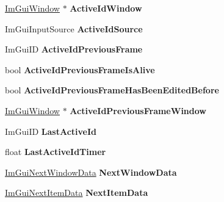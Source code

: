 \begin{DoxyCompactItemize}
\item 
\mbox{\label{structImGuiContext_a95a35b5d82d3fdea28b71580dc6a9618}} 
\hyperlink{structImGuiWindow}{Im\+Gui\+Window} $\ast$ {\bfseries Active\+Id\+Window}
\item 
\mbox{\label{structImGuiContext_a315c9fa88996fa84c260c93322941bf1}} 
Im\+Gui\+Input\+Source {\bfseries Active\+Id\+Source}
\item 
\mbox{\label{structImGuiContext_af58aa479f6c97819694f1709b62c70d8}} 
Im\+Gui\+ID {\bfseries Active\+Id\+Previous\+Frame}
\item 
\mbox{\label{structImGuiContext_aaaf25ebc4878ed8b203106accfc6b896}} 
bool {\bfseries Active\+Id\+Previous\+Frame\+Is\+Alive}
\item 
\mbox{\label{structImGuiContext_a47f47219d46552ceb11dc1eea8415cbb}} 
bool {\bfseries Active\+Id\+Previous\+Frame\+Has\+Been\+Edited\+Before}
\item 
\mbox{\label{structImGuiContext_ac164cf439dcb5d37f0e572f5e27eea25}} 
\hyperlink{structImGuiWindow}{Im\+Gui\+Window} $\ast$ {\bfseries Active\+Id\+Previous\+Frame\+Window}
\item 
\mbox{\label{structImGuiContext_a8609dbb667eced2b9f1eb1f0c0aff838}} 
Im\+Gui\+ID {\bfseries Last\+Active\+Id}
\item 
\mbox{\label{structImGuiContext_a7296c8f2a4794c561cfb4ad0af563928}} 
float {\bfseries Last\+Active\+Id\+Timer}
\item 
\mbox{\label{structImGuiContext_a1220ef65a7464ef2dc4a6020cd1b9c47}} 
\hyperlink{structImGuiNextWindowData}{Im\+Gui\+Next\+Window\+Data} {\bfseries Next\+Window\+Data}
\item 
\mbox{\label{structImGuiContext_a3c05fda47e3d35e3279387a2524ac6cb}} 
\hyperlink{structImGuiNextItemData}{Im\+Gui\+Next\+Item\+Data} {\bfseries Next\+Item\+Data}
\item 
\mbox{\label{structImGuiContext_a10f0f969b6c9886e5f2c080ed6f1370d}} 

\end{DoxyCompactItemize}
